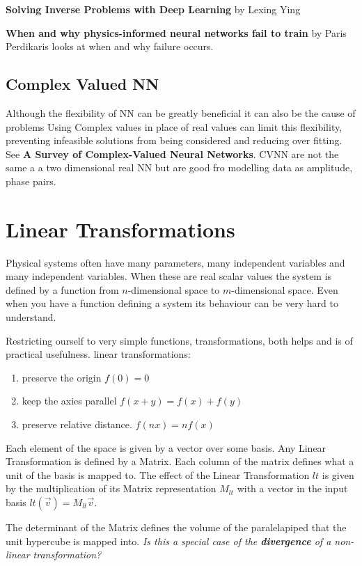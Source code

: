 {\bf Solving Inverse Problems with Deep Learning} by Lexing Ying

{\bf When and why physics-informed neural networks fail to train} by Paris Perdikaris looks at when and why failure occurs.

\subsection{Complex Valued NN}
Although the flexibility of NN can be greatly beneficial it can also be the cause of problems
Using Complex values in place of real values can limit this flexibility, preventing infeasible solutions from being considered and reducing over fitting. See {\bf A Survey of Complex-Valued Neural Networks}. CVNN are not the same a a two dimensional real NN but are good fro modelling data as amplitude, phase pairs.
  
\section{Linear Transformations}
Physical systems often have many parameters, many independent variables and many independent variables. When these are real scalar values the system is defined by a function from $n$-dimensional space to $m$-dimensional space. Even when you have a function defining a system its behaviour can be very hard to understand.

  Restricting ourself to  very simple functions, transformations, both helps and is of practical usefulness. linear transformations:
  \begin{enumerate}
  \item preserve the origin  $f(0) = 0$
  \item keep the axies parallel   $f(x+y) = f(x) + f(y)$
  \item preserve relative distance. $f(nx) = nf(x)$
  \end{enumerate}
 
 Each element of the space is given by a vector over some basis. Any Linear Transformation is 
 defined by a Matrix. Each column of the matrix defines what a unit of the basis is mapped to. The effect of the Linear Transformation $lt$ is given by the multiplication of its Matrix representation $M_{lt}$ with    a vector in the input basis $lt(\overrightarrow{v}) = M_{lt}\overrightarrow{v}$.
 
  The determinant of the Matrix defines the volume of the paralelapiped that the unit hypercube is mapped into. \emph{Is this a special case of  the {\bf divergence} of  a non-linear transformation?}
  
